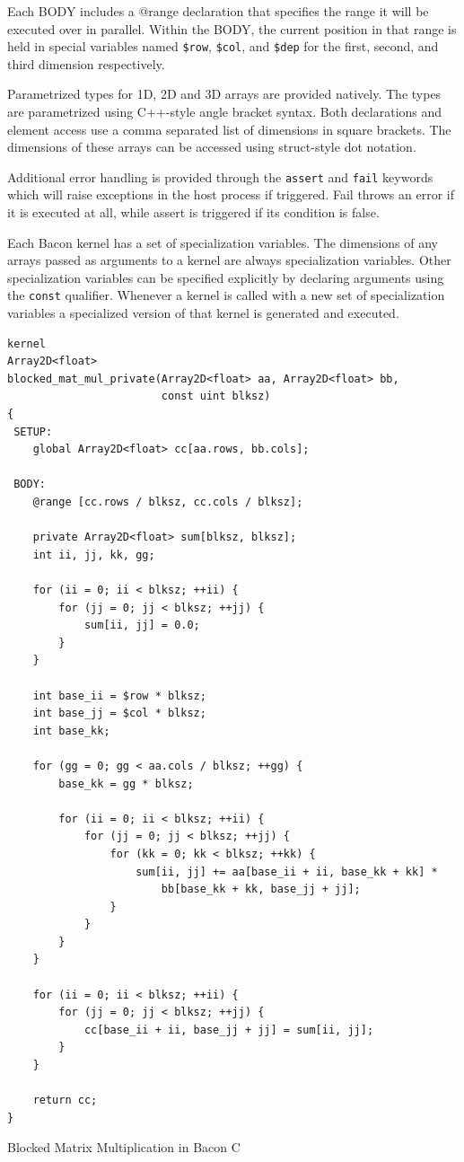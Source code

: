 \documentclass{llncs}
\begin{document}
Each BODY includes a @range declaration that specifies the range it
will be executed over in parallel. Within the BODY, the current
position in that range is held in special variables named {\tt\$row},
{\tt\$col}, and {\tt\$dep} for the first, second, and third dimension
respectively.

Parametrized types for 1D, 2D and 3D arrays are provided
natively. The types are parametrized using C++-style angle bracket
syntax. Both declarations and element access use a comma separated
list of dimensions in square brackets. The dimensions of these arrays
can be accessed using struct-style dot notation.

Additional error handling is provided through the {\tt assert} and
{\tt fail} keywords which will raise exceptions in the host process if
triggered. Fail throws an error if it is executed at all, while assert
is triggered if its condition is false.

Each Bacon kernel has a set of specialization variables. The
dimensions of any arrays passed as arguments to a kernel are always
specialization variables. Other specialization variables can be
specified explicitly by declaring arguments using the {\tt const}
qualifier. Whenever a kernel is called with a new set of
specialization variables a specialized version of that kernel is
generated and executed.

\begin{listing}[t!]
\begin{verbatim}
kernel
Array2D<float>
blocked_mat_mul_private(Array2D<float> aa, Array2D<float> bb, 
                        const uint blksz)
{
 SETUP:
    global Array2D<float> cc[aa.rows, bb.cols];

 BODY:
    @range [cc.rows / blksz, cc.cols / blksz];

    private Array2D<float> sum[blksz, blksz];
    int ii, jj, kk, gg;

    for (ii = 0; ii < blksz; ++ii) {
        for (jj = 0; jj < blksz; ++jj) {
            sum[ii, jj] = 0.0;
        }
    }

    int base_ii = $row * blksz;
    int base_jj = $col * blksz;
    int base_kk;

    for (gg = 0; gg < aa.cols / blksz; ++gg) {
        base_kk = gg * blksz;

        for (ii = 0; ii < blksz; ++ii) {
            for (jj = 0; jj < blksz; ++jj) {
                for (kk = 0; kk < blksz; ++kk) {
                    sum[ii, jj] += aa[base_ii + ii, base_kk + kk] * 
                        bb[base_kk + kk, base_jj + jj];
                }
            }
        }
    }

    for (ii = 0; ii < blksz; ++ii) {
        for (jj = 0; jj < blksz; ++jj) {
            cc[base_ii + ii, base_jj + jj] = sum[ii, jj];
        }
    }

    return cc;
}
\end{verbatim}
\caption{Blocked Matrix Multiplication in Bacon C}\label{bmmk}
\end{listing}
\afterpage{\FloatBarrier}
\end{document}

